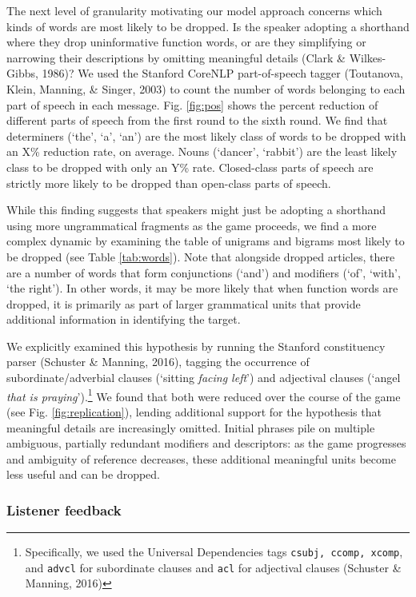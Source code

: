 \documentclass[alpha-refs]{wiley-article}
\begin{document}
The next level of granularity motivating our model approach concerns
which kinds of words are most likely to be dropped. Is the speaker
adopting a shorthand where they drop uninformative function words, or
are they simplifying or narrowing their descriptions by omitting
meaningful details (Clark \& Wilkes-Gibbs, 1986)? We used the Stanford
CoreNLP part-of-speech tagger (Toutanova, Klein, Manning, \& Singer,
2003) to count the number of words belonging to each part of speech in
each message. Fig. \ref{fig:pos} shows the percent reduction of
different parts of speech from the first round to the sixth round. We
find that determiners (`the', `a', `an') are the most likely class of
words to be dropped with an X\% reduction rate, on average. Nouns
(`dancer', `rabbit') are the least likely class to be dropped with only
an Y\% rate. Closed-class parts of speech are strictly more likely to be
dropped than open-class parts of speech.

While this finding suggests that speakers might just be adopting a
shorthand using more ungrammatical fragments as the game proceeds, we
find a more complex dynamic by examining the table of unigrams and
bigrams most likely to be dropped (see Table \ref{tab:words}). Note that
alongside dropped articles, there are a number of words that form
conjunctions (`and') and modifiers (`of', `with', `the right'). In other
words, it may be more likely that when function words are dropped, it is
primarily as part of larger grammatical units that provide additional
information in identifying the target.

We explicitly examined this hypothesis by running the Stanford
constituency parser (Schuster \& Manning, 2016), tagging the occurrence
of subordinate/adverbial clauses (`sitting \emph{facing left}') and
adjectival clauses (`angel \emph{that is praying}').\footnote{Specifically,
  we used the Universal Dependencies tags \texttt{csubj, ccomp, xcomp},
  and \texttt{advcl} for subordinate clauses and \texttt{acl} for
  adjectival clauses (Schuster \& Manning, 2016)} We found that both
were reduced over the course of the game (see Fig.
\ref{fig:replication}), lending additional support for the hypothesis
that meaningful details are increasingly omitted. Initial phrases pile
on multiple ambiguous, partially redundant modifiers and descriptors: as
the game progresses and ambiguity of reference decreases, these
additional meaningful units become less useful and can be dropped.

\subsubsection{Listener feedback}\label{listener-feedback}
\end{document}
